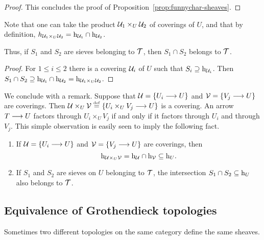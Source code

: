 \begin{2   CONTRAVARIANT FUNCTORS}
\begin{2.3 Sheaves in Grothendieck topologies}
\begin{proof}
This concludes the proof of Proposition~\ref{prop:funnychar-sheaves}.
\end{proof}
\begin{shaded}
Note that one can take the product $\mathcal{U}_1\times_U\mathcal{U}_2$ of coverings of $U$, and that by definition, $h_{\mathcal{U}_1 \times_{U} \mathcal{U}_2} = \mathrm{h}_{\mathcal{U}_1} \cap \mathrm{h}_{\mathcal{U}_2}$.

Thus, if $S_1$ and $S_2$ are sieves belonging to $\mathcal{T}$, then $S_1\cap S_2$ belongs to $\mathcal{T}$. 
\begin{proof}
For $1\leq i\leq2$ there is a covering $\mathcal{U}_i$ of $U$ such that $S_i\supseteq\mathrm{h}_{\mathcal{U}_i}$. Then $S_1\cap S_2\supseteq\mathrm{h}_{\mathcal{U}_1}\cap \mathrm{h}_{\mathcal{U}_2}=\mathrm{h}_{\mathcal{U}_1\times_U\mathcal{U}_2}$.
\end{proof}
\end{shaded}

We conclude with a remark. Suppose that $\mathcal{U} = \{U_{i}\longrightarrow U\}$ and $\mathcal{V} = \{V_{j}\longrightarrow U\}$ are coverings. Then $\mathcal{U} \times_{U} \mathcal{V} \overset{\mathrm{\scriptscriptstyle def}} = \{U_{i}\times_{U} V_{j}\longrightarrow U\}$ is a covering. An arrow $T \arr U$ factors through $U_{i}\times_{U} V_{j}$ if and only if it factors through $U_{i}$ and through $V_{j}$. This simple observation is easily seen to imply the following fact.

\begin{proposition}\label{prop:directed-sieves}\hfil
\begin{enumerate}

\item If $\mathcal{U} = \{U_{i}\longrightarrow U\}$ and $\mathcal{V} = \{V_{j}\longrightarrow U\}$ are coverings, then
   \[
   \mathrm{h}_{\mathcal{U} \times_{U} \mathcal{V}} = \mathrm{h}_{\mathcal{U}} \cap \mathrm{h}_{\mathcal{V}} \subseteq \mathrm{h}_{U}.
   \]

\item If $S_{1}$ and $S_{2}$ are sieves on $U$ belonging to $\mathcal{T}$, the intersection $S_{1} \cap S_{2} \subseteq \mathrm{h}_{U}$ also belongs to $\mathcal{T}$.
\end{enumerate}

\end{proposition}




\subsection{Equivalence of Grothendieck topologies}

Sometimes two different to\-pol\-ogies on the same category define the same sheaves.


\end{2.3 Sheaves in Grothendieck topologies}
\end{2   CONTRAVARIANT FUNCTORS}
